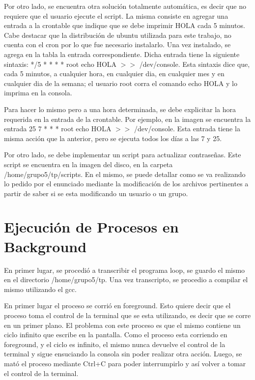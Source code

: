 \documentclass[a4paper, 12pt]{article}
\begin{document}
Por otro lado, se encuentra otra soluci\'on totalmente autom\'atica, es decir que no requiere que el usuario ejecute el script. La misma consiste en agregar una entrada a la crontable que indique que se debe imprimir HOLA cada 5 minutos. Cabe destacar que la distribuci\'on de ubuntu utilizada para este trabajo, no cuenta con el cron por lo que fue necesario instalarlo. Una vez instalado, se agrega en la tabla la entrada correspondiente. Dicha entrada tiene la siguiente sintaxis: */5  * * * * root echo HOLA $>>$ /dev/console. Esta sintaxis dice que, cada 5 minutos, a cualquier hora, en cualquier dia, en cualquier mes y en cualquier dia de la semana; el usuario root corra el comando echo HOLA y lo imprima en la consola.

Para hacer lo mismo pero a una hora determinada, se debe explicitar la hora requerida en la entrada de la crontable. Por ejemplo, en la imagen se encuentra la entrada 25 7 * * * root echo HOLA $>>$ /dev/console. Esta entrada tiene la misma acci\'on que la anterior, pero se ejecuta todos los d\'ias a las 7 y 25. 

\bigskip



Por otro lado, se debe implementar un script para actualizar contrase\~{n}as. Este script se encuentra en la imagen del disco, en la carpeta /home/grupo5/tp/scripts. En el mismo, se puede detallar como se va realizando lo pedido por el enunciado mediante la modificaci\'on de los archivos pertinentes a partir de saber si se esta modificando un usuario o un grupo.

\section*{Ejecuci\'on de Procesos en Background}

En primer lugar, se procedi\'o a transcribir el programa loop, se guardo el mismo en el directorio /home/grupo5/tp. Una vez transcripto, se procedio a compilar el mismo utilizando el gcc. 

\bigskip

En primer lugar el proceso se corri\'o en foreground. Esto quiere decir que el proceso toma el control de la terminal que se esta utilizando, es decir que se corre en un primer plano. El problema con este proceso es que el mismo contiene un ciclo infinito que escribe en la pantalla. Como el proceso esta corriendo en foreground, y el ciclo es infinito, el mismo nunca devuelve el control de la terminal y sigue ensuciando la consola sin poder realizar otra acci\'on. Luego, se mat\'o el proceso mediante Ctrl+C para poder interrumpirlo y as\'i volver a tomar el control de la terminal.
\end{document}
